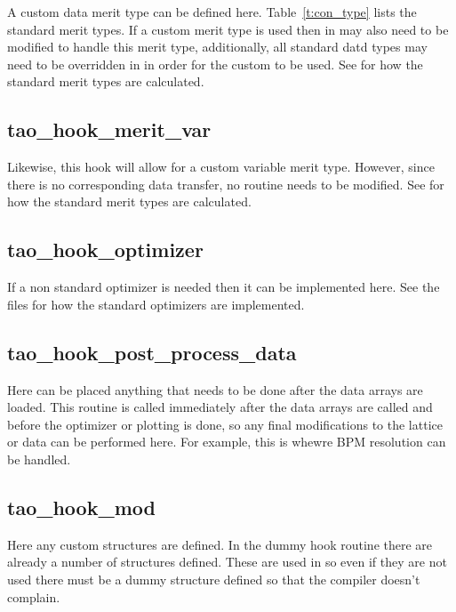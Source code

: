 A custom data merit type can be defined here. Table~\ref{t:con_type} lists the
standard merit types. If a custom merit type is used then  in
 may also need to be modified to handle this merit
type, additionally, all standard datd types may need to be overridden in 
 in order for the custom  to be used.
See  for how the standard merit types are calculated.

\subsection{tao\_hook\_merit\_var}

Likewise, this hook will allow for a custom variable merit type. However, since
there is no corresponding data transfer, no  routine needs to be modified.
See  for how the standard merit types are calculated.

\subsection{tao\_hook\_optimizer}

If a non standard optimizer is needed then it can be implemented here. See the
 files for how the standard optimizers are
implemented.

\subsection{tao\_hook\_post\_process\_data}

Here can be placed anything that needs to be done after the data arrays are
loaded. This routine is called immediately after the data arrays are called and
before the optimizer or plotting is done, so any final modifications to the
lattice or data can be performed here. For example, this is whewre BPM
resolution can be handled.

\subsection{tao\_hook\_mod}

Here any custom structures are defined. In the dummy hook routine there are
already a number of structures defined. These are used in
 so even if they are not used there must be a dummy
structure defined so that the compiler doesn't complain.

